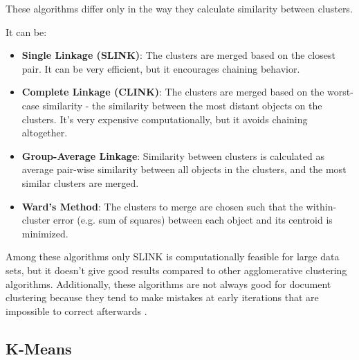 These algorithms differ only in the way they calculate 
similarity between clusters. 

It can be: 

\begin{itemize}
\itemsep1pt\parskip0pt
  \item \textbf{Single Linkage (SLINK)}: The clusters are merged based
on the closest pair. It can be very efficient, but it encourages 
chaining behavior.


  \item \textbf{Complete Linkage (CLINK)}: The clusters are merged 
  based on the worst-case similarity - the similarity between the most 
  distant objects on the clusters. It's very expensive computationally, 
  but it avoids chaining altogether. 


  \item \textbf{Group-Average Linkage}: Similarity between clusters 
  is calculated as average pair-wise similarity between all objects 
  in the clusters, and the most similar clusters are merged.

  \item \textbf{Ward's Method}: The clusters to merge are chosen such that the within-cluster
  error (e.g. sum of squares) between each object and its centroid 
  is minimized. 


\end{itemize}


Among these algorithms only SLINK is computationally feasible 
for large data sets, but it doesn't give good results compared to other 
agglomerative clustering algorithms. Additionally, these algorithms 
are not always good for document clustering because they tend to 
make mistakes at early iterations that are impossible to correct
afterwards \cite{steinbach2000comparison}.



\subsection{K-Means} \label{sec:kmeans}

